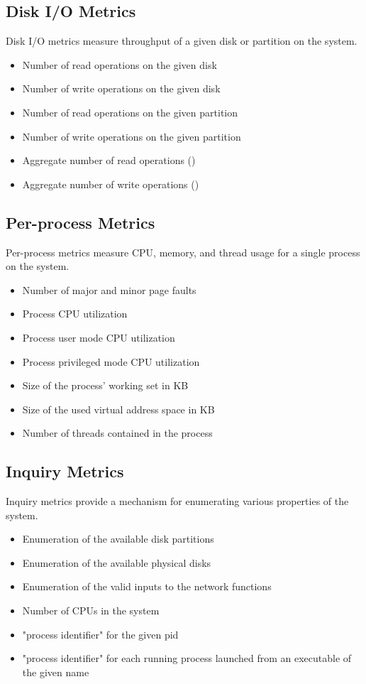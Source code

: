 \subsection{Disk I/O Metrics}
Disk I/O metrics measure throughput of a given disk or partition on the system.
\begin{itemize}
\item Number of read operations on the given disk 
\item Number of write operations on the given disk 
\item Number of read operations on the given partition 
\item Number of write operations on the given partition 
\item Aggregate number of read operations (\dcamp) 
\item Aggregate number of write operations (\dcamp)
\end{itemize}

\subsection{Per-process Metrics}
Per-process metrics measure CPU, memory, and thread usage for a single process on the system.
\begin{itemize}
\item Number of major and minor page faults 
\item Process CPU utilization 
\item Process user mode CPU utilization 
\item Process privileged mode CPU utilization 
\item Size of the process' working set in KB 
\item Size of the used virtual address space in KB 
\item Number of threads contained in the process
\end{itemize}

\subsection{Inquiry Metrics}
Inquiry metrics provide a mechanism for enumerating various properties of the system.
\begin{itemize}
\item Enumeration of the available disk partitions 
\item Enumeration of the available physical disks 
\item Enumeration of the valid inputs to the network functions 
\item Number of CPUs in the system 
\item "process identifier" for the given pid 
\item "process identifier" for each running process launched from an executable of the given name
\end{itemize}

